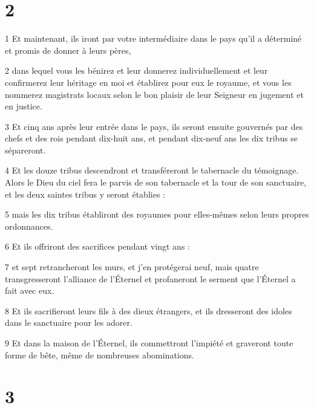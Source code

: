 \chapter{2}

\par 1 Et maintenant, ils iront par votre intermédiaire dans le pays qu'il a déterminé et promis de donner à leurs pères,
\par 2 dans lequel vous les bénirez et leur donnerez individuellement et leur confirmerez leur héritage en moi et établirez pour eux le royaume, et vous les nommerez magistrats locaux selon le bon plaisir de leur Seigneur en jugement et en justice.
\par 3 Et cinq ans après leur entrée dans le pays, ils seront ensuite gouvernés par des chefs et des rois pendant dix-huit ans, et pendant dix-neuf ans les dix tribus se sépareront.
\par 4 Et les douze tribus descendront et transféreront le tabernacle du témoignage. Alors le Dieu du ciel fera le parvis de son tabernacle et la tour de son sanctuaire, et les deux saintes tribus y seront établies :
\par 5 mais les dix tribus établiront des royaumes pour elles-mêmes selon leurs propres ordonnances.
\par 6 Et ils offriront des sacrifices pendant vingt ans :
\par 7 et sept retrancheront les murs, et j'en protégerai neuf, mais quatre transgresseront l'alliance de l'Éternel et profaneront le serment que l'Éternel a fait avec eux.
\par 8 Et ils sacrifieront leurs fils à des dieux étrangers, et ils dresseront des idoles dans le sanctuaire pour les adorer.
\par 9 Et dans la maison de l'Éternel, ils commettront l'impiété et graveront toute forme de bête, même de nombreuses abominations.

\chapter{3}

